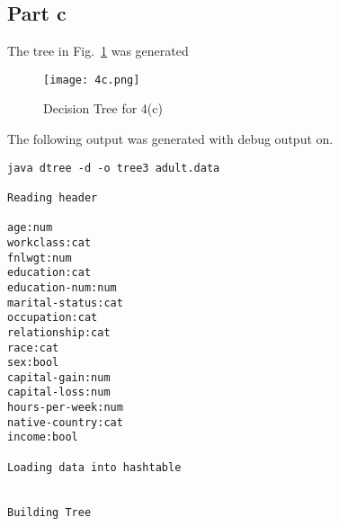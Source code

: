 \documentclass[a4paper,11pt,titlepage]{article}
\begin{document}
\subsection{Part c}
The tree in Fig.~\ref{Fig:4c} was generated
\begin{figure}[htbp]
   \centering
   \texttt{[image: 4c.png]}
   \caption{Decision Tree for 4(c)}
   \label{Fig:4c}
\end{figure}
The following output was generated with debug output on.
\begin{verbatim}
java dtree -d -o tree3 adult.data

Reading header

age:num
workclass:cat
fnlwgt:num
education:cat
education-num:num
marital-status:cat
occupation:cat
relationship:cat
race:cat
sex:bool
capital-gain:num
capital-loss:num
hours-per-week:num
native-country:cat
income:bool

Loading data into hashtable


Building Tree


\end{verbatim}
\end{document}
